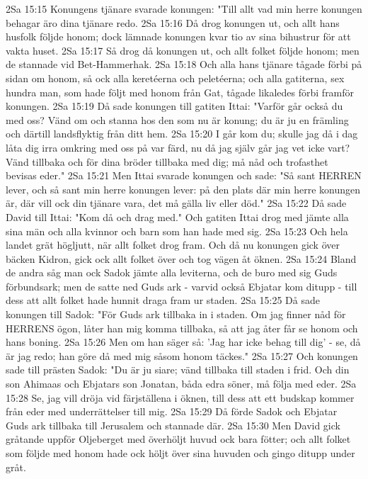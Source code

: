 2Sa 15:15  Konungens tjänare svarade konungen: "Till allt vad min herre konungen behagar äro dina tjänare redo.
2Sa 15:16  Då drog konungen ut, och allt hans husfolk följde honom; dock lämnade konungen kvar tio av sina bihustrur för att vakta huset.
2Sa 15:17  Så drog då konungen ut, och allt folket följde honom; men de stannade vid Bet-Hammerhak.
2Sa 15:18  Och alla hans tjänare tågade förbi på sidan om honom, så ock alla keretéerna och peletéerna; och alla gatiterna, sex hundra man, som hade följt med honom från Gat, tågade likaledes förbi framför konungen.
2Sa 15:19  Då sade konungen till gatiten Ittai: "Varför går också du med oss? Vänd om och stanna hos den som nu är konung; du är ju en främling och därtill landsflyktig från ditt hem.
2Sa 15:20  I går kom du; skulle jag då i dag låta dig irra omkring med oss på var färd, nu då jag själv går jag vet icke vart? Vänd tillbaka och för dina bröder tillbaka med dig; må nåd och trofasthet bevisas eder."
2Sa 15:21  Men Ittai svarade konungen och sade: "Så sant HERREN lever, och så sant min herre konungen lever: på den plats där min herre konungen är, där vill ock din tjänare vara, det må gälla liv eller död."
2Sa 15:22  Då sade David till Ittai: "Kom då och drag med." Och gatiten Ittai drog med jämte alla sina män och alla kvinnor och barn som han hade med sig.
2Sa 15:23  Och hela landet grät högljutt, när allt folket drog fram. Och då nu konungen gick över bäcken Kidron, gick ock allt folket över och tog vägen åt öknen.
2Sa 15:24  Bland de andra såg man ock Sadok jämte alla leviterna, och de buro med sig Guds förbundsark; men de satte ned Guds ark - varvid också Ebjatar kom ditupp - till dess att allt folket hade hunnit draga fram ur staden.
2Sa 15:25  Då sade konungen till Sadok: "För Guds ark tillbaka in i staden. Om jag finner nåd för HERRENS ögon, låter han mig komma tillbaka, så att jag åter får se honom och hans boning.
2Sa 15:26  Men om han säger så: 'Jag har icke behag till dig' - se, då är jag redo; han göre då med mig såsom honom täckes."
2Sa 15:27  Och konungen sade till prästen Sadok: "Du är ju siare; vänd tillbaka till staden i frid. Och din son Ahimaas och Ebjatars son Jonatan, båda edra söner, må följa med eder.
2Sa 15:28  Se, jag vill dröja vid färjställena i öknen, till dess att ett budskap kommer från eder med underrättelser till mig.
2Sa 15:29  Då förde Sadok och Ebjatar Guds ark tillbaka till Jerusalem och stannade där.
2Sa 15:30  Men David gick gråtande uppför Oljeberget med överhöljt huvud ock bara fötter; och allt folket som följde med honom hade ock höljt över sina huvuden och gingo ditupp under gråt.
